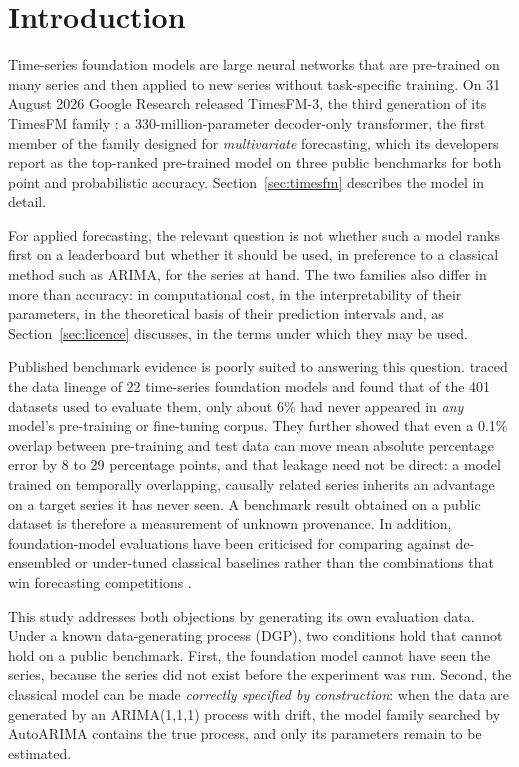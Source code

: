 \documentclass[11pt]{article}
\providecommand{\sectionref}[1]{Section~\ref{#1}}
\begin{document}
\section{Introduction}
\label{sec:intro}

Time-series foundation models are large neural networks that are pre-trained on many series
and then applied to new series without task-specific training. On 31 August 2026 Google Research
released TimesFM-3, the third generation of its TimesFM family \citep{timesfm3blog}: a
330-million-parameter decoder-only transformer, the first member of the family designed for
\emph{multivariate} forecasting, which its developers report as the top-ranked pre-trained model
on three public benchmarks for both point and probabilistic accuracy. \sectionref{sec:timesfm}
describes the model in detail.

For applied forecasting, the relevant question is not whether such a model ranks first on a
leaderboard but whether it should be used, in preference to a classical method such as ARIMA, for
the series at hand. The two families also differ in more than accuracy: in computational cost, in
the interpretability of their parameters, in the theoretical basis of their prediction intervals
and, as \sectionref{sec:licence} discusses, in the terms under which they may be used.

Published benchmark evidence is poorly suited to answering this question. \citet{meyer2025leakage} traced the data lineage of 22 time-series
foundation models and found that of the 401 datasets used to evaluate them, only about 6\%
had never appeared in \emph{any} model's pre-training or fine-tuning corpus. They further
showed that even a 0.1\% overlap between pre-training and test data can move mean absolute
percentage error by 8 to 29 percentage points, and that leakage need not be direct: a model
trained on temporally overlapping, causally related series inherits an advantage on a target
series it has never seen. A benchmark result obtained on a public dataset is therefore a
measurement of unknown provenance. In addition, foundation-model evaluations have been
criticised for comparing against de-ensembled or under-tuned classical baselines rather
than the combinations that win forecasting competitions \citep{makridakis2020m4}.

This study addresses both objections by generating its own evaluation data. Under a known
data-generating process (DGP), two conditions hold that cannot hold on a public benchmark.
First, the foundation model cannot have seen the series, because the series did not exist before
the experiment was run. Second, the classical model can be made \emph{correctly specified by
construction}: when the data are generated by an ARIMA(1,1,1) process with drift, the model
family searched by AutoARIMA contains the true process, and only its parameters remain to be
estimated.
\end{document}
